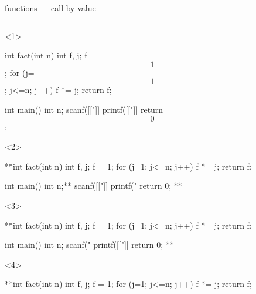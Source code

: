 \documentclass[10pt,t,svgnames]{beamer}
\begin{document}
  \begin{frame}[fragile]{functions --- call-by-value}
    \begin{columns}
      \begin{column}{.65\textwidth}
        \vspace{-15em} %
        \begin{scriptsize}
          \begin{onlyenv}<1>
            \begin{codeblock}[firstnumber=5, gobble=8]
              int fact(int n) {
                int f, j;
                f = $$1$$;
                for (j=$$1$$; j<=n; j++) {
                  f *= j;
                }
                return f;
              }

              int main() {
                int n;
                scanf([["]]%
                printf([["]]%
                return $$0$$;
              }
            \end{codeblock}
          \end{onlyenv}
          \begin{onlyenv}<2>
            \begin{codeblock}[firstnumber=5, gobble=8]
              **int fact(int n) {
                int f, j;
                f = 1;
                for (j=1; j<=n; j++) {
                  f *= j;
                }
                return f;
              }

              int main() {
                int n;**
                scanf([["]]%
                printf("%
                return 0;
              }**
            \end{codeblock}
          \end{onlyenv}
          \begin{onlyenv}<3>
            \begin{codeblock}[firstnumber=5, gobble=8]
              **int fact(int n) {
                int f, j;
                f = 1;
                for (j=1; j<=n; j++) {
                  f *= j;
                }
                return f;
              }

              int main() {
                int n;
                scanf("%
                printf([["]]%
                return 0;
              }**
            \end{codeblock}
          \end{onlyenv}
          \begin{onlyenv}<4>
            \begin{codeblock}[firstnumber=5, gobble=8]
              **int fact(int n) {
                int f, j;
                f = 1;
                for (j=1; j<=n; j++) {
                  f *= j;
                }
                return f;
              }


\end{codeblock}
\end{onlyenv}
\end{scriptsize}
\end{column}
\end{columns}
\end{frame}
\end{document}
